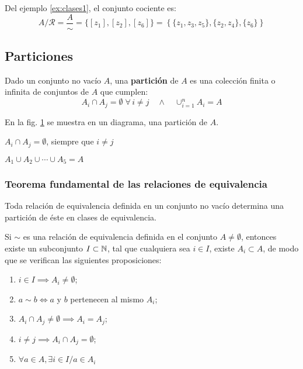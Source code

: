 \begin{fmd-example}
	Del ejemplo \ref{ex:clases1}, el conjunto cociente es:
	\[ A/ \mathcal{R} = \frac{A}{\sim} = \{ [z_1], [z_2], [z_6] \} = \left\{ \{ z_1, z_3, z_5 \}, \{ z_2, z_4 \}, \{ z_6 \} \right\} \] 
\end{fmd-example}

\subsection{Particiones} \label{sec:particiones}
\vspace{3mm}

\begin{fmd-definition}[Partición]
	Dado un conjunto no vacío $A$, una \textbf{partición} de $A$ es una colección finita o infinita de conjuntos de $A$ que cumplen:
	\[ A_i \cap A_j = \emptyset \; \forall \, i \ne j \quad \land \quad \cup_{i=1}^n A_i = A \]
\end{fmd-definition}

En la fig. \ref{fig:particion} se muestra en un diagrama, una partición de $A$.

\begin{minipage}{.45\textwidth}
	\begin{figure}[H]
		\centering
		
		\caption{}
		\label{fig:particion}
	\end{figure}
\end{minipage}
\begin{minipage}{.45\textwidth}
	$A_i \cap A_j = \emptyset$, siempre que $i \ne j$
	
	$A_1 \cup A_2 \cup \cdots \cup A_5 = A$
\end{minipage}

\subsubsection{Teorema fundamental de las relaciones de equivalencia}
Toda relación de equivalencia definida en un conjunto no vacío determina una partición de éste en clases de equivalencia.

\begin{fmd-theorem}
	Si $\sim$ es una relación de equivalencia definida en el conjunto $A \ne \emptyset$, entonces existe un subconjunto $I \subset \mathbb{N}$, tal que cualquiera sea $i \in I$, existe $A_i \subset A$, de modo que se verifican las siguientes proposiciones:
	\begin{enumerate}[label=\roman*)]
		\item $i \in I \implies A_i \ne \emptyset$;
		\item $a \sim b \iff a$ y $b$ pertenecen al mismo $A_i$;
		\item $A_i \cap A_j \ne \emptyset \implies A_i = A_j$;
		\item $i \ne j \implies A_i \cap A_j = \emptyset$;
		\item $\forall a \in A, \exists i \in I / a \in A_i$
	\end{enumerate}
\end{fmd-theorem}

